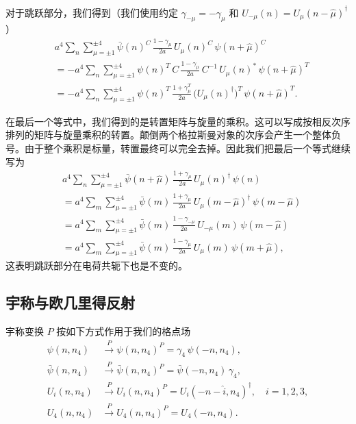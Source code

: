 对于跳跃部分，我们得到（我们使用约定 $\gamma_{-\mu} = -\gamma_\mu$ 和 $U_{-\mu}(n) = U_\mu(n-\hat{\mu})^\dagger$）
\begin{equation}
  \begin{aligned}
    &a^4\sum_{n}\sum_{\mu=\pm1}^{\pm4}\bar{\psi}(n)^C\,
      \frac{1-\gamma_\mu}{2a}\,U_\mu(n)^C\,\psi(n+\hat{\mu})^C\\
    &= -a^4\sum_{n}\sum_{\mu=\pm1}^{\pm4}\psi(n)^T\,C\,
      \frac{1-\gamma_\mu}{2a}\,C^{-1}\,U_\mu(n)^*\,\psi(n+\hat{\mu})^T\\
    &= -a^4\sum_{n}\sum_{\mu=\pm1}^{\pm4}\psi(n)^T\,
      \frac{1+\gamma_\mu^T}{2a}\,\big(U_\mu(n)^\dagger\big)^T\,\psi(n+\hat{\mu})^T .
  \end{aligned}
\end{equation}

在最后一个等式中，我们得到的是转置矩阵与旋量的乘积。这可以写成按相反次序排列的矩阵与旋量乘积的转置。颠倒两个格拉斯曼对象的次序会产生一个整体负号。由于整个乘积是标量，转置最终可以完全去掉。因此我们把最后一个等式继续写为
\begin{equation}
  \begin{aligned}
    &a^4\sum_{n}\sum_{\mu=\pm1}^{\pm4}\bar{\psi}(n+\hat{\mu})\,
      \frac{1+\gamma_\mu}{2a}\,U_\mu(n)^\dagger\,\psi(n)\\
    &= a^4\sum_{m}\sum_{\mu=\pm1}^{\pm4}\bar{\psi}(m)\,
      \frac{1+\gamma_\mu}{2a}\,U_\mu(m-\hat{\mu})^\dagger\,\psi(m-\hat{\mu})\\
    &= a^4\sum_{m}\sum_{\mu=\pm1}^{\pm4}\bar{\psi}(m)\,
      \frac{1-\gamma_{-\mu}}{2a}\,U_{-\mu}(m)\,\psi(m-\hat{\mu})\\
    &= a^4\sum_{m}\sum_{\mu=\pm1}^{\pm4}\bar{\psi}(m)\,
      \frac{1-\gamma_\mu}{2a}\,U_\mu(m)\,\psi(m+\hat{\mu}) ,
  \end{aligned}
\end{equation}
这表明跳跃部分在电荷共轭下也是不变的。

\subsection{宇称与欧几里得反射}

宇称变换 $P$ 按如下方式作用于我们的格点场
\begin{equation}
  \begin{aligned}
    \psi(n,n_4) &\xrightarrow{\;P\;} \psi(n,n_4)^P = \gamma_4\,\psi(-n,n_4),\\
    \bar{\psi}(n,n_4) &\xrightarrow{\;P\;} \bar{\psi}(n,n_4)^P = \bar{\psi}(-n,n_4)\,\gamma_4,\\
    U_i(n,n_4) &\xrightarrow{\;P\;} U_i(n,n_4)^P = U_i(-n-\hat{i},n_4)^\dagger, \quad i = 1, 2, 3,\\
    U_4(n,n_4) &\xrightarrow{\;P\;} U_4(n,n_4)^P = U_4(-n,n_4) .
  \end{aligned}
\end{equation}

